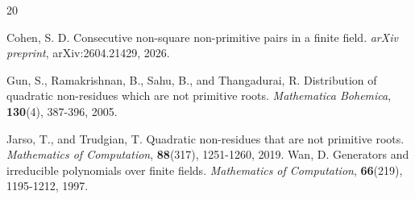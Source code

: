 \documentclass[12pt]{amsart}
\theoremstyle{definition}
\theoremstyle{remark}
\numberwithin{equation}{section}
\begin{document}
    \begin{thebibliography}{20}

 Cohen, S. D. Consecutive non-square non-primitive pairs in a finite field. {\em arXiv preprint}, arXiv:2604.21429, 2026.

Gun, S., Ramakrishnan, B., Sahu, B., and Thangadurai, R. Distribution of quadratic non-residues which are not primitive roots. {\em Mathematica Bohemica}, \textbf{130}(4), 387-396, 2005.

 Jarso, T., and Trudgian, T. Quadratic non-residues that are not primitive roots. {\em Mathematics of Computation}, \textbf{88}(317), 1251-1260, 2019.
Wan, D. Generators and irreducible polynomials over finite fields. {\em Mathematics of Computation}, \textbf{66}(219), 1195-1212, 1997.



    



    
\end{thebibliography}

    
\end{document}
